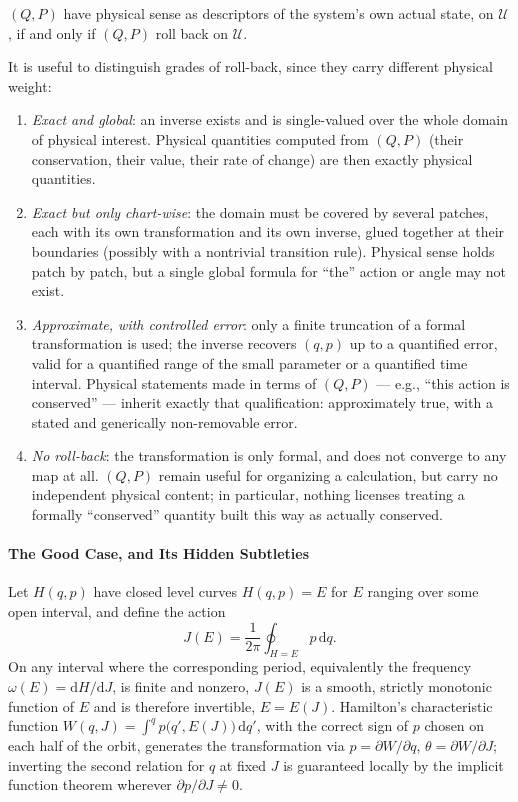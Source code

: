 \begin{proposition}
$(Q,P)$ have physical sense as descriptors of the system's own actual state, on
    $\mathcal U$, if and only if $(Q,P)$ roll back on $\mathcal U$.
\end{proposition}

It is useful to distinguish grades of roll-back, since they
carry different physical weight:
\begin{enumerate}
\item \emph{Exact and global}: an inverse exists and is single-valued over the
    whole domain of physical interest. Physical quantities computed from
        $(Q,P)$ (their conservation, their value, their rate of change) are
        then exactly physical quantities.
\item \emph{Exact but only chart-wise}: the domain must be covered by several
    patches, each with its own transformation and its own inverse, glued
        together at their boundaries (possibly with a nontrivial transition
        rule). Physical sense holds patch by patch, but a single global formula
        for ``the'' action or angle may not exist.
\item \emph{Approximate, with controlled error}: only a finite truncation of a
    formal transformation is used; the inverse recovers $(q,p)$ up to a
        quantified error, valid for a quantified range of the small parameter
        or a quantified time interval. Physical statements made in terms of
        $(Q,P)$ --- e.g., ``this action is conserved'' --- inherit exactly that
        qualification: approximately true, with a stated and generically
        non-removable error.
\item \emph{No roll-back}: the transformation is only formal, and does not
    converge to any map at all. $(Q,P)$ remain useful for organizing a
        calculation, but carry no independent physical content; in particular,
        nothing licenses treating a formally ``conserved'' quantity built this
        way as actually conserved.
\end{enumerate}

\paragraph{The Good Case, and Its Hidden Subtleties}

Let $H(q,p)$ have closed level curves $H(q,p)=E$ for $E$ ranging over some open
interval, and define the action
\begin{equation}
J(E)=\frac{1}{2\pi}\oint_{H=E} p\,\mathrm{d} q .
\label{actiondef}
\end{equation}
On any interval where the corresponding period, equivalently the frequency
$\omega(E)=\mathrm{d} H/\mathrm{d} J$, is finite and nonzero, $J(E)$ is a
smooth, strictly monotonic function of $E$ and is therefore invertible,
$E=E(J)$. Hamilton's characteristic function $W(q,J)=\int^q
p\big(q',E(J)\big)\,\mathrm{d} q'$, with the correct sign of $p$ chosen on each
half of the orbit, generates the transformation via $p=\partial W/\partial q$,
$\theta=\partial W/\partial J$; inverting the second relation for $q$ at fixed
$J$ is guaranteed locally by the implicit function theorem wherever $\partial
p/\partial J\neq0$.

